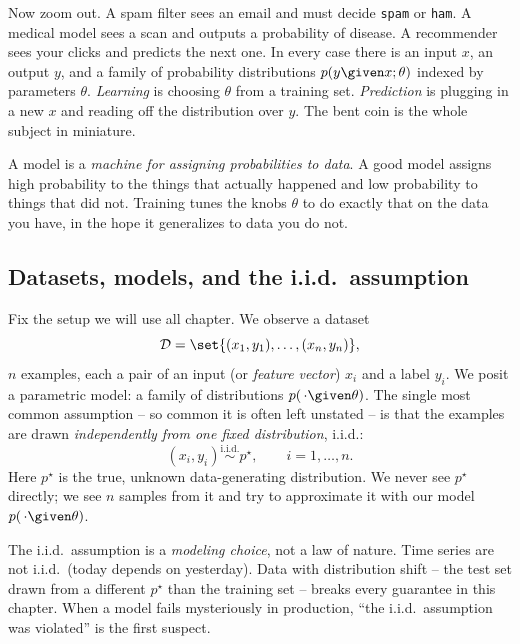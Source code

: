 Now zoom out. A spam filter sees an email and must decide \texttt{spam} or
\texttt{ham}. A medical model sees a scan and outputs a probability of disease. A
recommender sees your clicks and predicts the next one. In every case there is an
input $x$, an output $y$, and a family of probability distributions
$p(y \given x; \theta)$ indexed by parameters $\theta$. \emph{Learning} is
choosing $\theta$ from a training set. \emph{Prediction} is plugging in a new $x$
and reading off the distribution over $y$. The bent coin is the whole subject in
miniature.

\begin{intuitionbox}
A model is a \emph{machine for assigning probabilities to data}. A good model
assigns high probability to the things that actually happened and low
probability to things that did not. Training tunes the knobs $\theta$ to do
exactly that on the data you have, in the hope it generalizes to data you do not.
\end{intuitionbox}

\subsection{Datasets, models, and the i.i.d.\ assumption}

Fix the setup we will use all chapter. We observe a dataset
\[
  \mathcal{D} = \set{(x_1,y_1),\dots,(x_n,y_n)},
\]
$n$ examples, each a pair of an input (or \emph{feature vector}) $x_i$ and a
label $y_i$. We posit a parametric model: a family of distributions
$p(\,\cdot \given \theta)$. The single most common assumption -- so common it is
often left unstated -- is that the examples are drawn \emph{independently from one
fixed distribution}, i.i.d.:
\[
  (x_i,y_i) \overset{\text{i.i.d.}}{\sim} p^\star, \qquad i=1,\dots,n.
\]
Here $p^\star$ is the true, unknown data-generating distribution. We never see
$p^\star$ directly; we see $n$ samples from it and try to approximate it with our
model $p(\,\cdot\given\theta)$.

\begin{trapbox}
The i.i.d.\ assumption is a \emph{modeling choice}, not a law of nature. Time
series are not i.i.d.\ (today depends on yesterday). Data with distribution
shift -- the test set drawn from a different $p^\star$ than the training set --
breaks every guarantee in this chapter. When a model fails mysteriously in
production, ``the i.i.d.\ assumption was violated'' is the first suspect.
\end{trapbox}

